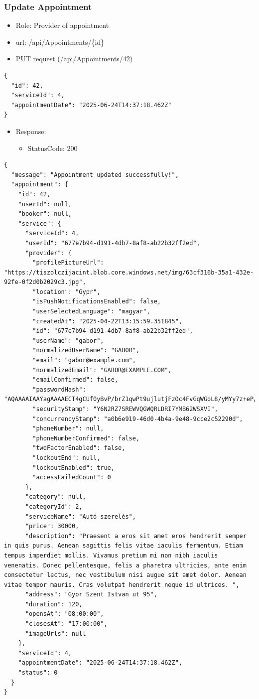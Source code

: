 \documentclass[11pt]{article}
\begin{document}
\subsubsection{Update Appointment}
\label{sec:orgd35ea35}
\begin{itemize}
\item Role: Provider of appointment
\item url: /api/Appointments/\{id\}
\item PUT request (/api/Appointments/42)
\end{itemize}
\begin{verbatim}
{
  "id": 42,
  "serviceId": 4,
  "appointmentDate": "2025-06-24T14:37:18.462Z"
}
\end{verbatim}
\begin{itemize}
\item Response:
\begin{itemize}
\item StatusCode: 200
\end{itemize}
\end{itemize}
\begin{verbatim}
{
  "message": "Appointment updated successfully!",
  "appointment": {
    "id": 42,
    "userId": null,
    "booker": null,
    "service": {
      "serviceId": 4,
      "userId": "677e7b94-d191-4db7-8af8-ab22b32ff2ed",
      "provider": {
        "profilePictureUrl": "https://tiszolczijacint.blob.core.windows.net/img/63cf316b-35a1-432e-92fe-0f2d0b2029c3.jpg",
        "location": "Gypr",
        "isPushNotificationsEnabled": false,
        "userSelectedLanguage": "magyar",
        "createdAt": "2025-04-22T13:15:59.351845",
        "id": "677e7b94-d191-4db7-8af8-ab22b32ff2ed",
        "userName": "gabor",
        "normalizedUserName": "GABOR",
        "email": "gabor@example.com",
        "normalizedEmail": "GABOR@EXAMPLE.COM",
        "emailConfirmed": false,
        "passwordHash": "AQAAAAIAAYagAAAAECT4gCUf0yBvP/brZ1qwPt9ujlutjFzOc4FvGqWGoL8/yMYy7z+eP/0E/Qqe1jIcJQ==",
        "securityStamp": "Y6N2RZ7SREWVQGWQRLDRI7YMB62WSXVI",
        "concurrencyStamp": "a0b6e919-46d0-4b4a-9e48-9cce2c52290d",
        "phoneNumber": null,
        "phoneNumberConfirmed": false,
        "twoFactorEnabled": false,
        "lockoutEnd": null,
        "lockoutEnabled": true,
        "accessFailedCount": 0
      },
      "category": null,
      "categoryId": 2,
      "serviceName": "Autó szerelés",
      "price": 30000,
      "description": "Praesent a eros sit amet eros hendrerit semper in quis purus. Aenean sagittis felis vitae iaculis fermentum. Etiam tempus imperdiet mollis. Vivamus pretium mi non nibh iaculis venenatis. Donec pellentesque, felis a pharetra ultricies, ante enim consectetur lectus, nec vestibulum nisi augue sit amet dolor. Aenean vitae tempor mauris. Cras volutpat hendrerit neque id ultrices. ",
      "address": "Gyor Szent Istvan ut 95",
      "duration": 120,
      "opensAt": "08:00:00",
      "closesAt": "17:00:00",
      "imageUrls": null
    },
    "serviceId": 4,
    "appointmentDate": "2025-06-24T14:37:18.462Z",
    "status": 0
  }
}
\end{verbatim}
\end{document}
